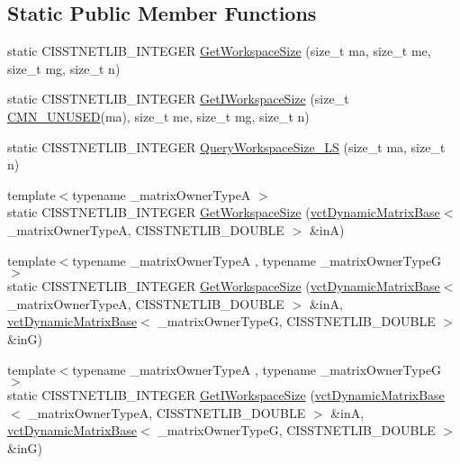 \subsection*{Static Public Member Functions}
\begin{DoxyCompactItemize}
\item 
static C\-I\-S\-S\-T\-N\-E\-T\-L\-I\-B\-\_\-\-I\-N\-T\-E\-G\-E\-R \hyperlink{classnmr_l_sq_lin_solution_dynamic_ad0709f0f58c8e5b89fa52fe73cd47eb9}{Get\-Workspace\-Size} (size\-\_\-t ma, size\-\_\-t me, size\-\_\-t mg, size\-\_\-t n)
\item 
static C\-I\-S\-S\-T\-N\-E\-T\-L\-I\-B\-\_\-\-I\-N\-T\-E\-G\-E\-R \hyperlink{classnmr_l_sq_lin_solution_dynamic_a45f0621fe6f842692ad960c6b81d61ef}{Get\-I\-Workspace\-Size} (size\-\_\-t \hyperlink{cmn_portability_8h_a021894e2626935fa2305434b1e893ff6}{C\-M\-N\-\_\-\-U\-N\-U\-S\-E\-D}(ma), size\-\_\-t me, size\-\_\-t mg, size\-\_\-t n)
\item 
static C\-I\-S\-S\-T\-N\-E\-T\-L\-I\-B\-\_\-\-I\-N\-T\-E\-G\-E\-R \hyperlink{classnmr_l_sq_lin_solution_dynamic_aed03cb7a228712334f74181aed1cb7f3}{Query\-Workspace\-Size\-\_\-\-L\-S} (size\-\_\-t ma, size\-\_\-t n)
\item 
{\footnotesize template$<$typename \-\_\-matrix\-Owner\-Type\-A $>$ }\\static C\-I\-S\-S\-T\-N\-E\-T\-L\-I\-B\-\_\-\-I\-N\-T\-E\-G\-E\-R \hyperlink{classnmr_l_sq_lin_solution_dynamic_ab0b85a963b72c6a336dad329fab500fa}{Get\-Workspace\-Size} (\hyperlink{classvct_dynamic_matrix_base}{vct\-Dynamic\-Matrix\-Base}$<$ \-\_\-matrix\-Owner\-Type\-A, C\-I\-S\-S\-T\-N\-E\-T\-L\-I\-B\-\_\-\-D\-O\-U\-B\-L\-E $>$ \&in\-A)
\item 
{\footnotesize template$<$typename \-\_\-matrix\-Owner\-Type\-A , typename \-\_\-matrix\-Owner\-Type\-G $>$ }\\static C\-I\-S\-S\-T\-N\-E\-T\-L\-I\-B\-\_\-\-I\-N\-T\-E\-G\-E\-R \hyperlink{classnmr_l_sq_lin_solution_dynamic_a403e05b68004e8e302efe38ed77bd325}{Get\-Workspace\-Size} (\hyperlink{classvct_dynamic_matrix_base}{vct\-Dynamic\-Matrix\-Base}$<$ \-\_\-matrix\-Owner\-Type\-A, C\-I\-S\-S\-T\-N\-E\-T\-L\-I\-B\-\_\-\-D\-O\-U\-B\-L\-E $>$ \&in\-A, \hyperlink{classvct_dynamic_matrix_base}{vct\-Dynamic\-Matrix\-Base}$<$ \-\_\-matrix\-Owner\-Type\-G, C\-I\-S\-S\-T\-N\-E\-T\-L\-I\-B\-\_\-\-D\-O\-U\-B\-L\-E $>$ \&in\-G)
\item 
{\footnotesize template$<$typename \-\_\-matrix\-Owner\-Type\-A , typename \-\_\-matrix\-Owner\-Type\-G $>$ }\\static C\-I\-S\-S\-T\-N\-E\-T\-L\-I\-B\-\_\-\-I\-N\-T\-E\-G\-E\-R \hyperlink{classnmr_l_sq_lin_solution_dynamic_a3365706bb493a44fc5ead21f6acef5dc}{Get\-I\-Workspace\-Size} (\hyperlink{classvct_dynamic_matrix_base}{vct\-Dynamic\-Matrix\-Base}$<$ \-\_\-matrix\-Owner\-Type\-A, C\-I\-S\-S\-T\-N\-E\-T\-L\-I\-B\-\_\-\-D\-O\-U\-B\-L\-E $>$ \&in\-A, \hyperlink{classvct_dynamic_matrix_base}{vct\-Dynamic\-Matrix\-Base}$<$ \-\_\-matrix\-Owner\-Type\-G, C\-I\-S\-S\-T\-N\-E\-T\-L\-I\-B\-\_\-\-D\-O\-U\-B\-L\-E $>$ \&in\-G)

\end{DoxyCompactItemize}
